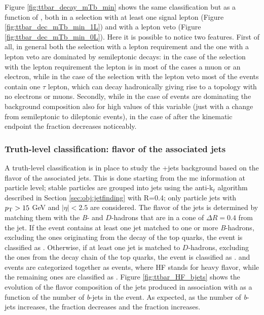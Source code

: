 Figure \ref{fig:ttbar_decay_mTb_min} shows the same \ttbar classification but as a function of \mtb, both in a selection with at least one signal lepton (Figure \ref{fig:ttbar_dec_mTb_min_1L}) and with a lepton veto (Figure \ref{fig:ttbar_dec_mTb_min_0L}). Here it is possible to notice two features. First of all, in general both the selection with a lepton requirement and the one with a lepton veto are dominated by semileptonic decays: in the case of the selection with the lepton requirement the lepton is in most of the cases a muon or an electron, while in the case of the selection with the lepton veto most of the events contain one $\tau$ lepton, which can decay hadronically giving rise to a topology with no electrons or muons.
Secondly, while in the case of \mt \ttbar events are dominating the background composition also for high values of this variable (just with a change from semileptonic to dileptonic \ttbar events), in the case of \mtb after the kinematic endpoint the \ttbar fraction decreases noticeably. 




\subsubsection*{Truth-level classification: flavor of the associated jets}

A truth-level classification is in place to study the \ttbar+jets background based on the flavor of the associated jets.
This is done starting from the \gls{mc} information at particle level; stable particles are grouped into jets using the anti-k$_t$ algorithm 
described in Section \ref{sec:obj:jetfinding} with R=0.4; only particle jets with $p_{\rm T} > 15$ GeV and $|\eta|<2.5$ are considered. 
The flavor of the jets is determined by matching them with the \textit{B}- and $D$-hadrons that are in a cone of $\Delta R = 0.4$ from the jet. 
If the event contains at least one jet matched to one or more \textit{B}-hadrons, excluding the ones originating from the decay of the top quarks, the event 
is classified as \ttbb. Otherwise, if at least one jet is matched to $D$-hadrons, excluding the ones from the decay chain of the top quarks, the event is classified as \ttcc. \ttbb and \ttcc events are categorized together as \tthf events, where HF stands for heavy flavor, while the remaining ones are classified as \ttlight.
Figure \ref{fig:ttbar_HF_bjets} shows the evolution of the flavor composition of the jets produced in association with \ttbar
as a function of the number of \textit{b}-jets in the event. 
As expected, as the number of \textit{b}-jets increases, the \ttlight fraction decreases and the \ttbb fraction increases. 

